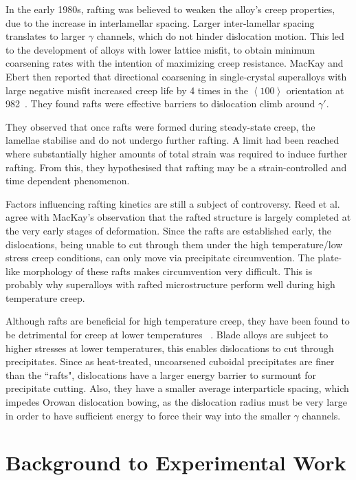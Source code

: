 \vspace{-1cm}
%
In the early 1980s, rafting was believed to weaken the alloy's creep properties, due to the increase in interlamellar spacing.  Larger inter-lamellar spacing translates to larger $\gamma$ channels, which do not hinder dislocation motion.  This led to the development of alloys with lower lattice misfit, to obtain minimum coarsening rates with the intention of maximizing creep resistance.  MacKay and Ebert then reported that directional coarsening in single-crystal superalloys with large negative misfit increased creep life by 4 times in the $\left<100\right>$ orientation at 982\celsius\ \cite{mackay83}.  They found rafts were effective barriers to dislocation climb around $\gamma'$.

They observed that once rafts were formed during steady-state creep, the lamellae stabilise and do not undergo further rafting.  A limit had been reached where substantially higher amounts of total strain was required to induce further rafting.  From this, they hypothesised that rafting may be a strain-controlled and time dependent phenomenon.

Factors influencing rafting kinetics are still a subject of controversy.  Reed et al. agree with MacKay's observation that the rafted structure is largely completed at the very early stages of deformation.  Since the rafts are established early, the dislocations, being unable to cut through them under the high temperature/low stress creep conditions, can only move via precipitate circumvention.  The plate-like morphology of these rafts makes circumvention very difficult.  This is probably why superalloys with rafted microstructure perform well during high temperature creep.

Although rafts are beneficial for high temperature creep, they have been found to be detrimental for creep at lower temperatures ~\cite{hobbs08}.  Blade alloys are subject to higher stresses at lower temperatures, this enables dislocations to cut through precipitates.  Since as heat-treated, uncoarsened cuboidal precipitates are finer than the ``rafts", dislocations have a larger energy barrier to surmount for precipitate cutting.  Also, they have a smaller average interparticle spacing, which impedes Orowan dislocation bowing, as the dislocation radius must be very large in order to have sufficient energy to force their way into the smaller $\gamma$ channels.


\section{Background to Experimental Work}
